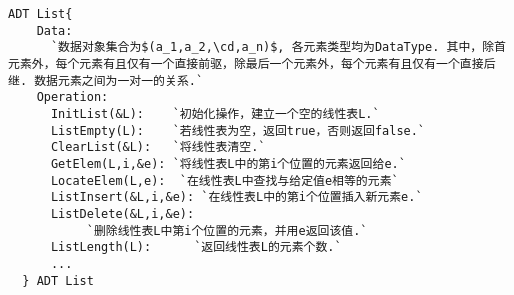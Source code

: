 \begin{lstlisting}[mathescape=true,frame=tb]
  ADT List{
    Data:
      `数据对象集合为$(a_1,a_2,\cd,a_n)$, 各元素类型均为DataType. 其中，除首元素外，每个元素有且仅有一个直接前驱，除最后一个元素外，每个元素有且仅有一个直接后继. 数据元素之间为一对一的关系.`
    Operation:
      InitList(&L):    `初始化操作，建立一个空的线性表L.`
      ListEmpty(L):    `若线性表为空，返回true，否则返回false.`
      ClearList(&L):   `将线性表清空.`
      GetElem(L,i,&e): `将线性表L中的第i个位置的元素返回给e.`
      LocateElem(L,e):  `在线性表L中查找与给定值e相等的元素`
      ListInsert(&L,i,&e): `在线性表L中的第i个位置插入新元素e.`
      ListDelete(&L,i,&e):  
           `删除线性表L中第i个位置的元素，并用e返回该值.`
      ListLength(L):      `返回线性表L的元素个数.`      
      ...
  } ADT List
\end{lstlisting}
